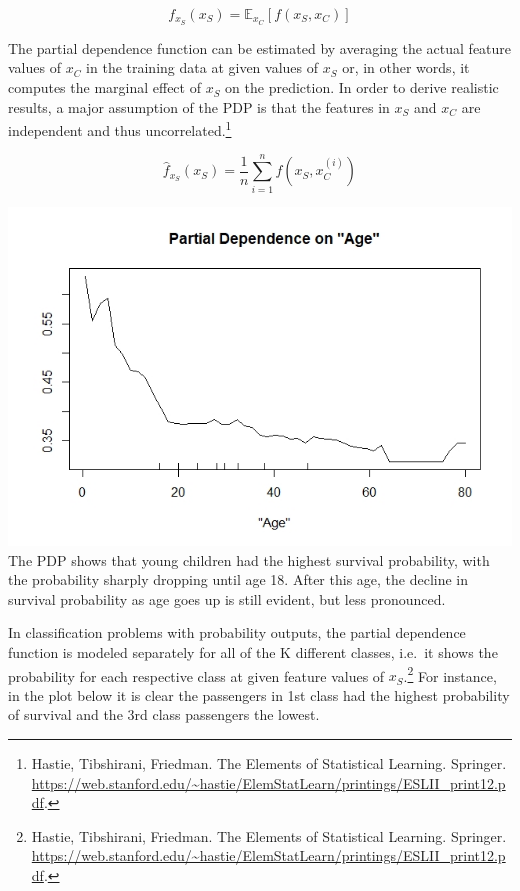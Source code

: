 \documentclass[]{krantz}
\begin{document}
\[f_{x_S}(x_S) = \mathbb{E}_{x_C}[f(x_S, x_C)]\]

The partial dependence function can be estimated by averaging the actual
feature values of \(x_C\) in the training data at given values of
\(x_S\) or, in other words, it computes the marginal effect of \(x_S\)
on the prediction. In order to derive realistic results, a major
assumption of the PDP is that the features in \(x_S\) and \(x_C\) are
independent and thus uncorrelated.\footnote{Hastie, Tibshirani,
  Friedman. The Elements of Statistical Learning. Springer.
  \url{https://web.stanford.edu/~hastie/ElemStatLearn/printings/ESLII_print12.pdf}.}

\[\hat{f}_{x_S}(x_S)=\frac{1}{n}\sum_{i=1}^{n}f(x_S, x^{(i)}_{C})\]

\includegraphics{PDP_Age.jpeg} The PDP shows that young children had the
highest survival probability, with the probability sharply dropping
until age 18. After this age, the decline in survival probability as age
goes up is still evident, but less pronounced.

In classification problems with probability outputs, the partial
dependence function is modeled separately for all of the K different
classes, i.e.~it shows the probability for each respective class at
given feature values of \(x_S\).\footnote{Hastie, Tibshirani, Friedman.
  The Elements of Statistical Learning. Springer.
  \url{https://web.stanford.edu/~hastie/ElemStatLearn/printings/ESLII_print12.pdf}.}
For instance, in the plot below it is clear the passengers in 1st class
had the highest probability of survival and the 3rd class passengers the
lowest.
\end{document}
